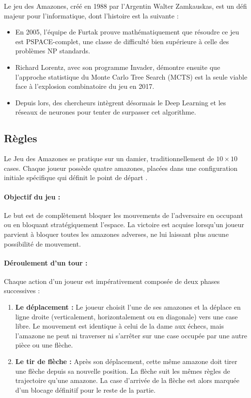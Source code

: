 \documentclass[11pt,a4paper,titlepage,oneside]{article}
\begin{document}
Le jeu des Amazones, créé en 1988 par l'Argentin Walter Zamkauskas, est un défi majeur pour l'informatique, dont l'histoire est la suivante :
\begin{itemize}
    \item En 2005, l'équipe de Furtak prouve mathématiquement que résoudre ce jeu est PSPACE-complet, une classe de difficulté bien supérieure à celle des problèmes NP standards. \cite{furtak2005generalized}
    \item Richard Lorentz, avec son programme Invader, démontre ensuite que l'approche statistique du Monte Carlo Tree Search (MCTS) est la seule viable face à l'explosion combinatoire du jeu en 2017.\cite{lorentz2008amazons}
    \item Depuis lors, des chercheurs intègrent désormais le Deep Learning et les réseaux de neurones pour tenter de surpasser cet algorithme.\cite{9534274}
    
    
\end{itemize}

    \subsection{Règles}

    Le Jeu des Amazones se pratique sur un damier, traditionnellement de $10 \times 10$ cases. Chaque joueur possède quatre amazones, placées dans une configuration initiale spécifique qui définit le point de départ .
    
    \paragraph{Objectif du jeu :}Le but est de complètement bloquer les mouvements de l'adversaire en occupant ou en bloquant stratégiquement l'espace. La victoire est acquise lorsqu'un joueur parvient à bloquer toutes les amazones adverses, ne lui laissant plus aucune possibilité de mouvement.
     
    \paragraph{Déroulement d'un tour :}Chaque action d'un joueur est impérativement composée de deux phases successives :
    \begin{enumerate}
    
    \item \textbf{Le déplacement :} Le joueur choisit l'une de ses amazones et la déplace en ligne droite (verticalement, horizontalement ou en diagonale) vers une case libre. Le mouvement est identique à celui de la dame aux échecs, mais l'amazone ne peut ni traverser ni s'arrêter sur une case occupée par une autre pièce ou une flèche.
    \item \textbf{Le tir de flèche :} Après son déplacement, cette même amazone doit tirer une flèche depuis sa nouvelle position. La flèche suit les mêmes règles de trajectoire qu'une amazone. La case d'arrivée de la flèche est alors marquée d'un blocage définitif pour le reste de la partie.
    \end{enumerate}
\end{document}
